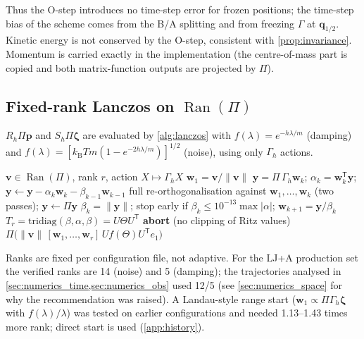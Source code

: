 \documentclass[11pt]{article}
\DeclareRobustCommand{\_}{\textunderscore\allowbreak}
\theoremstyle{remark}
\theoremstyle{definition}
\newcommand{\bq}{\mathbf{q}}
\newcommand{\bp}{\mathbf{p}}
\newcommand{\bv}{\mathbf{v}}
\newcommand{\kT}{k_{\mathrm B}T}
\newcommand{\Gh}{\Gamma_h}
\newcommand{\Ran}{\operatorname{Ran}}
\begin{document}
Thus the O-step introduces no time-step error for frozen positions; the time-step bias of the scheme comes from the
B/A splitting and from freezing $\Gamma$ at $\bq_{1/2}$. Kinetic energy is not conserved by the O-step, consistent
with \cref{prop:invariance}. Momentum is carried exactly in the implementation (the centre-of-mass part is copied and
both matrix-function outputs are projected by $\Pi$).

\subsection{Fixed-rank Lanczos on \texorpdfstring{$\Ran(\Pi)$}{Ran(Pi)}}\label{sec:lanczos}

$R_h\Pi\bp$ and $S_h\Pi\boldsymbol\zeta$ are evaluated by \cref{alg:lanczos} with $f(\lambda)=e^{-h\lambda/m}$
(damping) and $f(\lambda)=[\kT m(1-e^{-2h\lambda/m})]^{1/2}$ (noise), using only $\Gh$ actions.

\begin{algorithm}[t]
\caption{Direct-start Lanczos approximation of $f(\Gh)\bv$ on $\Ran(\Pi)$ (\texttt{test\_lanczos\_fdt.\allowbreak lanczos},
\texttt{test\_true\_dynamics.\allowbreak lanczos\_apply})}\label{alg:lanczos}
\begin{algorithmic}[1]
\Require $\bv\in\Ran(\Pi)$, rank $r$, action $X\mapsto\Gh X$
\State $\mathbf w_1=\bv/\|\bv\|$
  \State $\mathbf y=\Pi\,\Gh\mathbf w_k$; $\alpha_k=\mathbf w_k^{\mathsf T}\mathbf y$;
  $\mathbf y\gets\mathbf y-\alpha_k\mathbf w_k-\beta_{k-1}\mathbf w_{k-1}$
  \State full re-orthogonalisation against $\mathbf w_1,\dots,\mathbf w_k$ (two passes); $\mathbf y\gets\Pi\mathbf y$
  \State $\beta_k=\|\mathbf y\|$; stop early if $\beta_k\le10^{-13}\max|\alpha|$; $\mathbf w_{k+1}=\mathbf y/\beta_k$
\EndFor
\State $T_r=\mathrm{tridiag}(\beta,\alpha,\beta)=U\Theta U^{\mathsf T}$
 \textbf{abort} (no clipping of Ritz values) \EndIf
\State \Return $\Pi\big(\|\bv\|\,[\mathbf w_1,\dots,\mathbf w_r]\,U f(\Theta)U^{\mathsf T}e_1\big)$
\end{algorithmic}
\end{algorithm}

Ranks are fixed per configuration file, not adaptive. For the LJ+A production set the verified ranks are 14 (noise)
and 5 (damping); the trajectories analysed in \cref{sec:numerics_time,sec:numerics_obs} used 12/5 (see
\cref{sec:numerics_space} for why the recommendation was raised). A Landau-style range start
($\mathbf w_1\propto\Pi\Gh\boldsymbol\zeta$ with $f(\lambda)/\lambda$) was tested on earlier configurations and needed
1.13--1.43 times more rank; direct start is used (\cref{app:history}).
\end{document}
